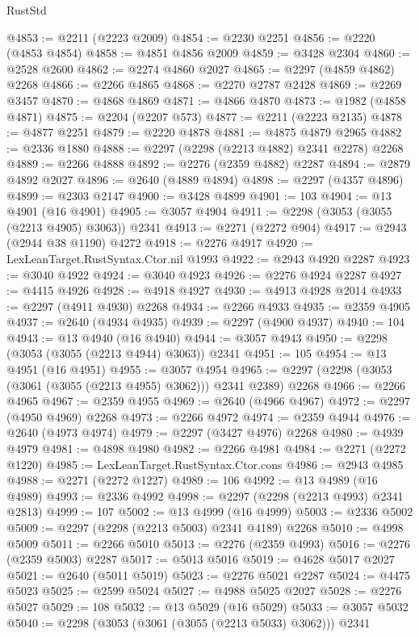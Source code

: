 \begin{lexlean}{RustStd}
\begin{coremodule}
{\begin{coremodule}
{{{{{{{{{{{{{{{{{{{{{{{{{{{{{{{{{{{{{{{{{{{{{{{{{{{{{{@4853 := @2211 (@2223 @2009)
@4854 := @2230 @2251
@4856 := @2220 (@4853 @4854)
@4858 := @4851 @4856 @2009
@4859 := @3428 @2304
@4860 := @2528 @2600
@4862 := @2274 @4860 @2027
@4865 := @2297 (@4859 @4862) @2268
@4866 := @2266 @4865
@4868 := @2270 @2787 @2428
@4869 := @2269 @3457
@4870 := @4868 @4869
@4871 := @4866 @4870
@4873 := @1982 (@4858 @4871)
@4875 := @2204 (@2207 @573)
@4877 := @2211 (@2223 @2135)
@4878 := @4877 @2251
@4879 := @2220 @4878
@4881 := @4875 @4879 @2965
@4882 := @2336 @1880
@4888 := @2297 (@2298 (@2213 @4882) @2341 @2278) @2268
@4889 := @2266 @4888
@4892 := @2276 (@2359 @4882) @2287
@4894 := @2879 @4892 @2027
@4896 := @2640 (@4889 @4894)
@4898 := @2297 (@4357 @4896)
@4899 := @2303 @2147
@4900 := @3428 @4899
@4901 := 103
@4904 := @13 @4901 (@16 @4901)
@4905 := @3057 @4904
@4911 := @2298 (@3053 (@3055 (@2213 @4905) @3063)) @2341
@4913 := @2271 (@2272 @904)
@4917 := @2943 (@2944 @38 @1190) @4272
@4918 := @2276 @4917
@4920 := LexLeanTarget.RustSyntax.Ctor.nil @1993
@4922 := @2943 @4920 @2287
@4923 := @3040 @4922
@4924 := @3040 @4923
@4926 := @2276 @4924 @2287
@4927 := @4415 @4926
@4928 := @4918 @4927
@4930 := @4913 @4928 @2014
@4933 := @2297 (@4911 @4930) @2268
@4934 := @2266 @4933
@4935 := @2359 @4905
@4937 := @2640 (@4934 @4935)
@4939 := @2297 (@4900 @4937)
@4940 := 104
@4943 := @13 @4940 (@16 @4940)
@4944 := @3057 @4943
@4950 := @2298 (@3053 (@3055 (@2213 @4944) @3063)) @2341
@4951 := 105
@4954 := @13 @4951 (@16 @4951)
@4955 := @3057 @4954
@4965 := @2297 (@2298 (@3053 (@3061 (@3055 (@2213 @4955) @3062))) @2341 @2389) @2268
@4966 := @2266 @4965
@4967 := @2359 @4955
@4969 := @2640 (@4966 @4967)
@4972 := @2297 (@4950 @4969) @2268
@4973 := @2266 @4972
@4974 := @2359 @4944
@4976 := @2640 (@4973 @4974)
@4979 := @2297 (@3427 @4976) @2268
@4980 := @4939 @4979
@4981 := @4898 @4980
@4982 := @2266 @4981
@4984 := @2271 (@2272 @1220)
@4985 := LexLeanTarget.RustSyntax.Ctor.cons
@4986 := @2943 @4985
@4988 := @2271 (@2272 @1227)
@4989 := 106
@4992 := @13 @4989 (@16 @4989)
@4993 := @2336 @4992
@4998 := @2297 (@2298 (@2213 @4993) @2341 @2813)
@4999 := 107
@5002 := @13 @4999 (@16 @4999)
@5003 := @2336 @5002
@5009 := @2297 (@2298 (@2213 @5003) @2341 @4189) @2268
@5010 := @4998 @5009
@5011 := @2266 @5010
@5013 := @2276 (@2359 @4993)
@5016 := @2276 (@2359 @5003) @2287
@5017 := @5013 @5016
@5019 := @4628 @5017 @2027
@5021 := @2640 (@5011 @5019)
@5023 := @2276 @5021 @2287
@5024 := @4475 @5023
@5025 := @2599 @5024
@5027 := @4988 @5025 @2027
@5028 := @2276 @5027
@5029 := 108
@5032 := @13 @5029 (@16 @5029)
@5033 := @3057 @5032
@5040 := @2298 (@3053 (@3061 (@3055 (@2213 @5033) @3062))) @2341
}}}}}}}}}}}}}}}}}}}}}}}}}}}}}}}}}}}}}}}}}}}}}}}}}}}}}}
\end{coremodule}}
\end{coremodule}
\end{lexlean}
